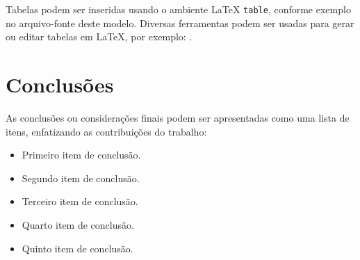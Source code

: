 \documentclass[%
  a4paper,%
  12pt,%
  fleqn,%
  english,%
  brazilian,%
]{article}
\begin{document}
Tabelas podem ser inseridas usando o ambiente \LaTeX{} \texttt{table}, conforme exemplo no arquivo-fonte deste modelo.
Diversas ferramentas podem ser usadas para gerar ou editar tabelas em \LaTeX{}, por exemplo: .

\section{Conclusões}%
\label{sect:concl}

As conclusões ou considerações finais podem ser apresentadas como uma lista de itens, enfatizando as contribuições do trabalho:

\begin{itemize}
\item Primeiro item de conclusão.
\item Segundo item de conclusão.
\item Terceiro item de conclusão.
\item Quarto item de conclusão.
\item Quinto item de conclusão.
\end{itemize}
\end{document}
